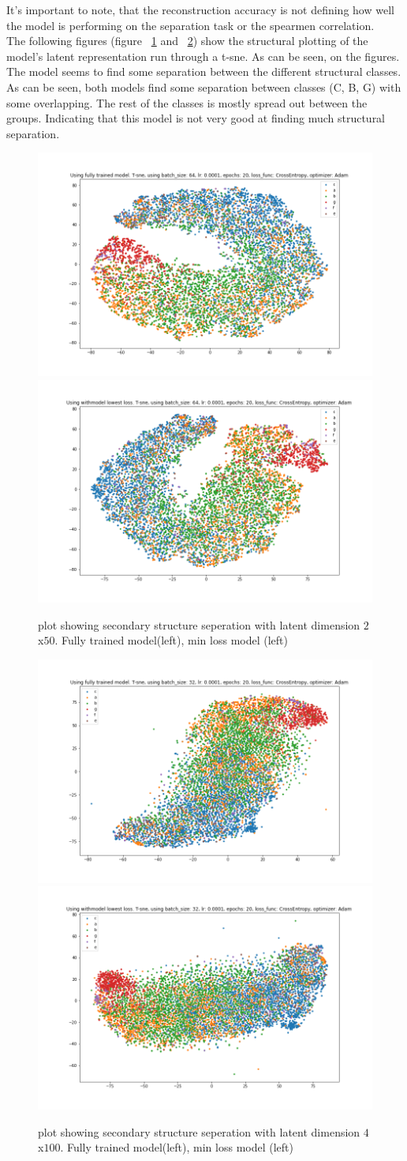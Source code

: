\noindent
It's important to note, that the reconstruction accuracy is not defining how well the model is performing on the separation task or the spearmen correlation.\\

\noindent
The following figures (figure ~\ref{fig:plot_50} and ~\ref{fig:plot_100}) show the structural plotting of the model's latent representation run through a t-sne. As can be seen, on the figures. The model seems to find some separation between the different structural classes. As can be seen, both models find some separation between classes (C, B, G) with some overlapping. The rest of the classes is mostly spread out between the groups. Indicating that this model is not very good at finding much structural separation. \\

\begin{figure}[!ht]
  \centering
  \includegraphics[width=0.4\linewidth]{latex/imgs/last_50.png}
  \includegraphics[width=0.4\linewidth]{latex/imgs/best_50.png}
  \caption{plot showing secondary structure seperation with latent dimension $2$x$50$. Fully trained model(left), min loss model (left)}
  \label{fig:plot_50}
\end{figure}

\begin{figure}[!ht]
  \centering
  \includegraphics[width=0.4\linewidth]{latex/imgs/last_100.png}
  \includegraphics[width=0.4\linewidth]{latex/imgs/best_100.png}
  \caption{plot showing secondary structure seperation with latent dimension $4$x$100$. Fully trained model(left), min loss model (left)}
  \label{fig:plot_100}
\end{figure}

